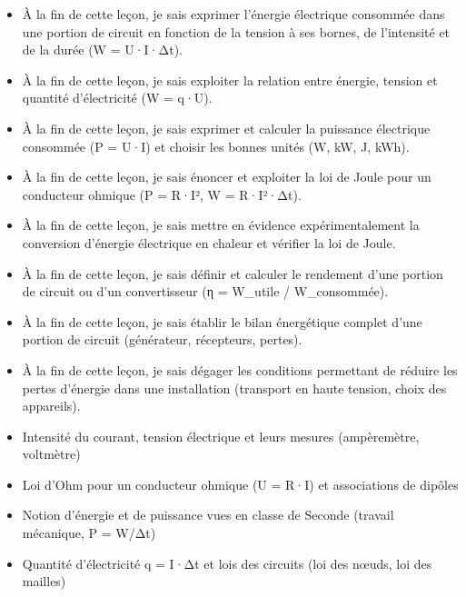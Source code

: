 \documentclass[11pt]{article}
\begin{document}
\begin{objectifs}
\begin{itemize}
\item À la fin de cette leçon, je sais exprimer l'énergie électrique consommée dans une portion de circuit en fonction de la tension à ses bornes, de l'intensité et de la durée (W = U·I·Δt).
\item À la fin de cette leçon, je sais exploiter la relation entre énergie, tension et quantité d'électricité (W = q·U).
\item À la fin de cette leçon, je sais exprimer et calculer la puissance électrique consommée (P = U·I) et choisir les bonnes unités (W, kW, J, kWh).
\item À la fin de cette leçon, je sais énoncer et exploiter la loi de Joule pour un conducteur ohmique (P = R·I², W = R·I²·Δt).
\item À la fin de cette leçon, je sais mettre en évidence expérimentalement la conversion d'énergie électrique en chaleur et vérifier la loi de Joule.
\item À la fin de cette leçon, je sais définir et calculer le rendement d'une portion de circuit ou d'un convertisseur (η = W\_utile / W\_consommée).
\item À la fin de cette leçon, je sais établir le bilan énergétique complet d'une portion de circuit (générateur, récepteurs, pertes).
\item À la fin de cette leçon, je sais dégager les conditions permettant de réduire les pertes d'énergie dans une installation (transport en haute tension, choix des appareils).
\end{itemize}
\end{objectifs}

\begin{prerequis}
\begin{itemize}
\item Intensité du courant, tension électrique et leurs mesures (ampèremètre, voltmètre)
\item Loi d'Ohm pour un conducteur ohmique (U = R·I) et associations de dipôles
\item Notion d'énergie et de puissance vues en classe de Seconde (travail mécanique, P = W/Δt)
\item Quantité d'électricité q = I·Δt et lois des circuits (loi des nœuds, loi des mailles)
\end{itemize}
\end{prerequis}

\newpage
\end{document}

